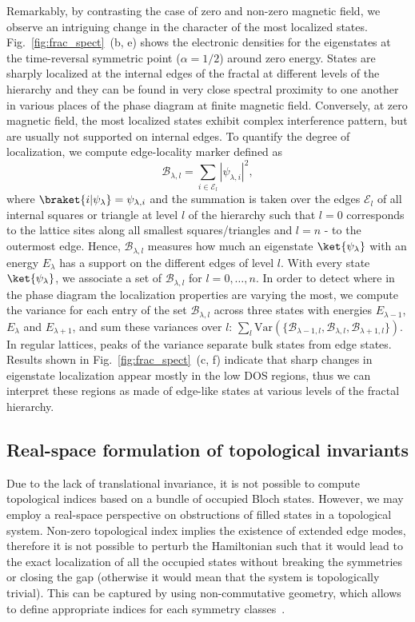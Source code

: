 Remarkably, by contrasting the case of zero and non-zero magnetic field, we observe an intriguing change in the character of the most localized states. Fig.~\ref{fig:frac_spect}~(b, e) shows the electronic densities for the eigenstates at the time-reversal symmetric point ($\alpha = 1/2$) around zero energy. States are sharply localized at the internal edges of the fractal at different levels of the hierarchy and they can be found in very close spectral proximity to one another in various places of the phase diagram at finite magnetic field. Conversely, at zero magnetic field, the most localized states exhibit complex interference pattern, but are usually not supported on internal edges. To quantify the degree of localization, we compute edge-locality marker defined as
\begin{equation}
\mathcal{B}_{\lambda, l} = \sum_{i \in \mathcal{E}_l} | \psi_{\lambda,i} |^2, 
\label{eq:edgemarker}
\end{equation}
where $\braket{i | \psi_{\lambda}} = \psi_{\lambda,i} $ and the summation is taken over the edges $\mathcal{E}_l$ of all internal squares or triangle at level $l$ of the hierarchy such that $l = 0$ corresponds to the lattice sites along all smallest squares/triangles and $l = n$  - to the outermost edge. Hence, $\mathcal{B}_{\lambda, l}$ measures how much an eigenstate $\ket{\psi_{\lambda}}$ with an energy $E_{\lambda}$ has a support on the different edges of level $l$. With every state $\ket{\psi_{\lambda}}$, we associate a set of $\mathcal{B}_{\lambda, l}$ for $l = 0, \ldots, n$. In order to detect where in the phase diagram the localization properties are varying the most, we compute the variance for each entry of the set $\mathcal{B}_{\lambda, l}$ across three states with energies $E_{\lambda - 1}$, $E_{\lambda}$ and $E_{\lambda+1}$, and sum these variances over $l$: $\sum_l \mathrm{Var} \left( \lbrace \mathcal{B}_{\lambda - 1, l}, \mathcal{B}_{\lambda, l}, \mathcal{B}_{\lambda + 1, l} \rbrace \right)$. In regular lattices, peaks of the variance separate bulk states from edge states. Results shown in Fig.~\ref{fig:frac_spect}~(c, f) indicate that sharp changes in eigenstate localization appear mostly in the low DOS regions, thus we can interpret these regions as made of edge-like states at various levels of the fractal hierarchy.   

\subsection{Real-space formulation of topological invariants}
Due to the lack of translational invariance, it is not possible to compute topological indices based on a bundle of occupied Bloch states. However, we may employ a real-space perspective on obstructions of filled states in a topological system. Non-zero topological index implies the existence of extended edge modes, therefore it is not possible to perturb the Hamiltonian such that it would lead to the exact localization of all the occupied states without breaking the symmetries or closing the gap (otherwise it would mean that the system is topologically trivial). This can be captured by using non-commutative geometry, which allows to define appropriate indices for each symmetry classes~\cite{2011:Prodan}. 

